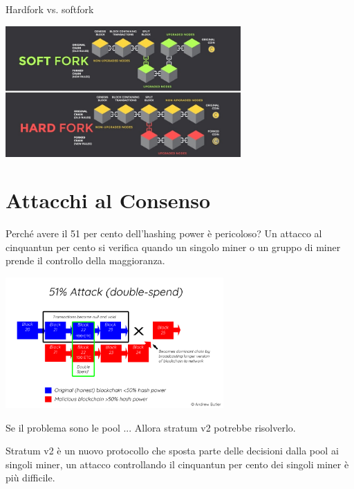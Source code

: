 \documentclass[aspectratio=169]{beamer}
\begin{document}
\begin{frame}{Hardfork vs. softfork}
    \begin{center}
        \includegraphics[height=5cm]{forks.jpg}
    \end{center}   
\end{frame}

\section{Attacchi al Consenso}

\begin{frame}{Perché avere il 51 per cento dell'hashing power è pericoloso?}
    Un attacco al cinquantun per cento si verifica quando un singolo miner o un gruppo di miner prende il controllo della maggioranza.

    \begin{center}
        \includegraphics[height=5cm]{double_spend.png}
    \end{center}
\end{frame}

\begin{frame}{Se il problema sono le pool ...}
    Allora stratum v2 potrebbe risolverlo.

    Stratum v2 è un nuovo protocollo che sposta parte delle decisioni dalla pool ai singoli miner, un attacco controllando il cinquantun per cento dei singoli miner è più difficile.
\end{frame}



\end{document}
